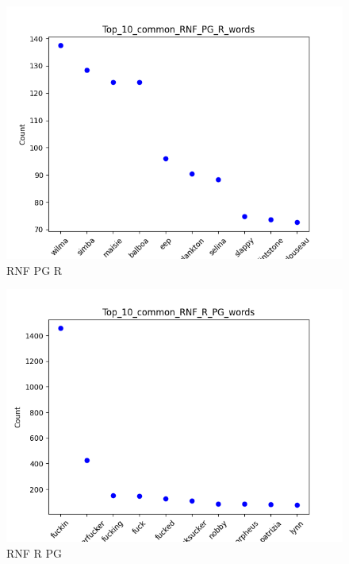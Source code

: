 \documentclass[a4paper]{article}
\begin{document}
\begin{figure}[ht]
    \centering
    \includegraphics[width=1\textwidth]{../stats/Top_10_common_RNF_PG_R_words.png}
    \caption{RNF PG R}
\end{figure}


\begin{figure}[ht]
    \centering
    \includegraphics[width=1\textwidth]{../stats/Top_10_common_RNF_R_PG_words.png}
    \caption{RNF R PG}
\end{figure}
\end{document}
